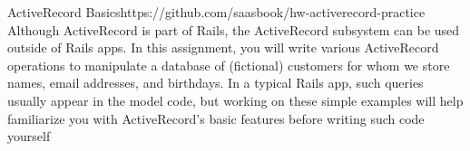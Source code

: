 \begin{chips}{ActiveRecord Basics}{https://github.com/saasbook/hw-activerecord-practice}
    Although ActiveRecord is part of Rails, the ActiveRecord subsystem
    can be used outside of Rails apps.
    In this assignment, you will write various ActiveRecord operations
    to manipulate a database of (fictional) customers for whom we store
    names, email addresses, and birthdays.  In a typical Rails app, such queries
    usually appear in the model code, but working on these simple examples
    will help familiarize you with ActiveRecord's basic features before
    writing such code yourself
\end{chips}